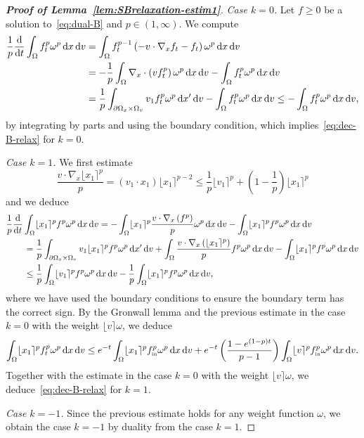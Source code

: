 \documentclass[11pt]{amsart}
\theoremstyle{definition}
\theoremstyle{remark}
\numberwithin{equation}{section}
\newcommand{\dd}{{\, \mathrm d}}
\newcommand{\dt}{\frac{{\rm d}}{{\rm d}t}}
\newcommand{\init}{\text{{\tiny {\rm in}}}}
\newcommand{\wangle}[1]{\lfloor #1 \rceil}
\begin{document}
\begin{proof}[{\bf Proof of Lemma~\ref{lem:SBrelaxation-estim1}}]
  \emph{Case $k=0$.} Let $f \ge 0$ be a solution to~\eqref{eq:dual-B} and $p \in (1,\infty)$. We compute
  \begin{align*}
    \frac1p  \dt \int_\Omega  f_t ^p   \omega^p \dd x \dd v
    &= \int_\Omega     f_t ^{p-1} \left( - v \cdot \nabla_x f_t  - f_t \right) \omega^p \dd x \dd v \\
    &= -\frac1p   \int_\Omega \nabla_x \cdot \left( v   f_t ^{p} \right) \omega^p \dd x \dd v -  \int_\Omega  f_t ^p \omega^p \dd x \dd v \\
    &= \frac1p \int_{\partial \Omega_x \times \Omega_v} v_1 f_t ^{p} \omega^p \dd x ' \dd v - \int_\Omega f_t ^p \omega^p \dd x \dd v \le - \int_\Omega f_t ^p \omega^p \dd x \dd v,
  \end{align*}
  by integrating by parts and using the boundary condition, which implies~\eqref{eq:dec-B-relax} for $k=0$.

  \smallskip \noindent
  \emph{Case $k=1$.} We first estimate
  \begin{equation*}
    \frac{v \cdot \nabla_x \wangle{x_1}^{p}}{p}
    = \left( v_1 \cdot x_1 \right) \wangle{x_1}^{p-2} \le
    \frac1p \wangle{v_1}^p + \left( 1 - \frac{1}{p} \right) \wangle{x_1}^p
  \end{equation*}
  and we deduce
  \begin{align*}
    & \frac1p\dt \int_\Omega \wangle{x_1}^p f^p \omega^p \dd x \dd v
      = - \int_\Omega \wangle{x_1}^{p} \frac{v \cdot \nabla_x \left( f^{p} \right)}{p} \omega^p \dd x \dd v -  \int_\Omega \wangle{x_1}^{p}  f^p \omega^p \dd x \dd v \\
    & \qquad = \frac{1}{p} \int_{\partial \Omega_x \times \Omega_v} v_1 \wangle{x_1}^p f^p \omega^p \dd x' \dd v + \int_\Omega \frac{v \cdot \nabla_x\left( \wangle{x_1}^p \right)}{p} f^{p} \omega^p \dd x \dd v  - \int_\Omega \wangle{x_1}^p  f^p \omega^p \dd x \dd v \\
    & \qquad \le \frac1p \int_\Omega \wangle{v_1}^p f^p \omega^p \dd x \dd v - \frac1p \int_\Omega \wangle{x_1}^p f^p \omega^p \dd x \dd v,
  \end{align*}
  where we have used the boundary conditions to ensure the boundary term has the correct sign. By the Gronwall lemma and the previous estimate in the case $k=0$ with the weight $\wangle{v} \omega$, we deduce
  \begin{equation*}
    \int_\Omega \wangle{x_1}^p f_t^p \omega^p \dd x \dd v  \le
    e^{-t} \int_\Omega \wangle{x_1}^p f_\init^p \omega^p \dd x \dd v + e^{-t} \left(\frac{1-e^{(1-p)t}}{p-1} \right) \int_\Omega \wangle{v}^p f_\init^p \omega^p \dd x \dd v.
  \end{equation*}
  Together with the estimate in the case $k=0$ with the weight $\wangle{v} \omega$, we deduce~\eqref{eq:dec-B-relax} for $k=1$.

  \smallskip \noindent
  \emph{Case $k=-1$.} Since the previous estimate holds for any weight function $\omega$, we obtain the case $k=-1$ by duality from the case $k=1$. 
 \end{proof}
\end{document}
